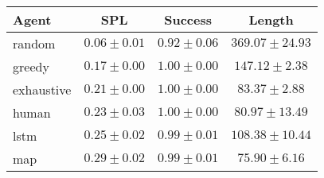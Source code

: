 \begin{tabular}{lccc}
    \toprule
    Agent & SPL & Success & Length \\
    \midrule
    random & $0.06 \pm 0.01$ & $0.92 \pm 0.06$ & $369.07 \pm 24.93$\\
    greedy & $0.17 \pm 0.00$ & $1.00 \pm 0.00$ & $147.12 \pm 2.38$\\
    exhaustive & $0.21 \pm 0.00$ & $1.00 \pm 0.00$ & $83.37 \pm 2.88$\\
    human & $0.23 \pm 0.03$ & $1.00 \pm 0.00$ & $80.97 \pm 13.49$\\
    lstm & $0.25 \pm 0.02$ & $0.99 \pm 0.01$ & $108.38 \pm 10.44$\\
    map & $0.29 \pm 0.02$ & $0.99 \pm 0.01$ & $75.90 \pm 6.16$\\
    \bottomrule
\end{tabular}
